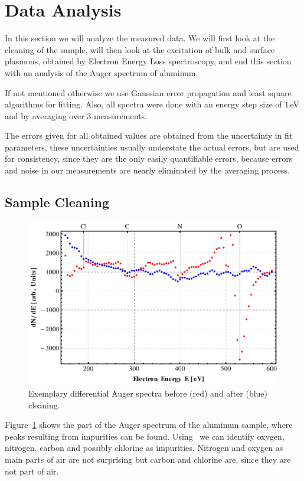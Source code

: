 \documentclass[a4paper,10pt]{scrartcl}
\begin{document}
\section{Data Analysis}

In this section we will analyze the measured data. We will first look at the cleaning of the sample, will then look at the excitation of bulk and surface plasmons, obtained by Electron Energy Loss spectroscopy, and end this section with an analysis of the Auger spectrum of aluminum.

If not mentioned otherwise we use Gaussian error propagation and least square algorithms for fitting. Also, all spectra were done with an energy step size of $1\,$eV and by averaging over $3$ measurements.

The errors given for all obtained values are obtained from the uncertainty in fit parameters, these uncertainties usually understate the actual errors, but are used for consistency, since they are the only easily quantifiable errors, because errors and noise in our measurements are nearly eliminated by the averaging process.

\subsection{Sample Cleaning}

\begin{figure}
\centering
\includegraphics[scale=0.6]{img/cleaning}
\caption{Exemplary differential Auger spectra before (red) and after (blue) cleaning. \label{fig:cleaning}}
\end{figure}

Figure~\ref{fig:cleaning} shows the part of the Auger spectrum of the aluminum sample, where peaks resulting from impurities can be found. Using~\cite{handbook} we can identify oxygen, nitrogen, carbon and possibly chlorine as impurities. Nitrogen and oxygen as main parts of air are not surprising but carbon and chlorine are, since they are not part of air.
\end{document}
